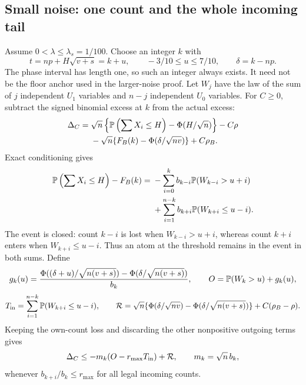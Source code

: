 \subsection{Small noise: one count and the whole incoming tail}
\label{short:count:small}

Assume $0<\lambda\le\lambda_s=1/100$. Choose an integer $k$ with
\[
 t=np+H\sqrt{v+s}=k+u,\qquad -3/10\le u\le7/10,
 \qquad\delta=k-np.
\]
The phase interval has length one, so such an integer always exists.
It need not be the floor anchor used in the larger-noise proof.
Let $W_j$ have the law of the sum of $j$
independent $U_1$ variables and $n-j$ independent $U_0$ variables. For
$C\ge0$, subtract the signed binomial excess at $k$ from the actual excess:
\begin{align*}
 \Delta_C={}&\sqrt n\left\{\mathbb P\left(\sum X_i\le H\right)
                                  -\Phi(H/\sqrt n)\right\}-C\rho\\
 &-\sqrt n\{F_B(k)-\Phi(\delta/\sqrt{nv})\}+C\rho_B.
\end{align*}
Exact conditioning gives
\begin{align*}
 \mathbb P\left(\sum X_i\le H\right)-F_B(k)
 ={}&-\sum_{i=0}^{k}b_{k-i}\mathbb P(W_{k-i}>u+i)\\
    &+\sum_{i=1}^{n-k}b_{k+i}\mathbb P(W_{k+i}\le u-i).
\end{align*}
The event is closed: count $k-i$ is lost when $W_{k-i}>u+i$,
whereas count $k+i$ enters when $W_{k+i}\le u-i$. Thus an atom at the
threshold remains in the event in both sums. Define
\[
 g_k(u)=\frac{\Phi((\delta+u)/\sqrt{n(v+s)})
                   -\Phi(\delta/\sqrt{n(v+s)})}{b_k},\qquad
 O=\mathbb P(W_k>u)+g_k(u),
\]
\[
 T_{\rm in}=\sum_{i=1}^{n-k}\mathbb P(W_{k+i}\le u-i),\qquad
 \mathcal R=\sqrt n\{\Phi(\delta/\sqrt{nv})
                -\Phi(\delta/\sqrt{n(v+s)})\}+C(\rho_B-\rho).
\]
Keeping the own-count loss and discarding the other nonpositive outgoing
terms gives
\begin{equation}\label{short:count:small-master}
 \Delta_C\le-m_k(O-r_{\max}T_{\rm in})+\mathcal R,
 \qquad m_k=\sqrt n\,b_k,
\end{equation}
whenever $b_{k+i}/b_k\le r_{\max}$ for all legal incoming counts.

